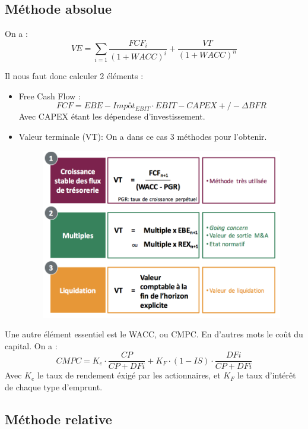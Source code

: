 \documentclass[12pt,oneside,a4paper]{article}
\begin{document}
\subsection{Méthode absolue} %
\label{sub:méthode_absolue}

On a :
\[
	VE= \sum_{i=1} \frac{FCF_i}{(1+WACC)^i} + \frac{VT}{(1+WACC)^n}
\]

Il nous faut donc calculer 2 éléments :

\begin{itemize}[label=]

	\item Free Cash Flow : 
	\[
		FCF=EBE-Impôt_{EBIT}\cdot EBIT - CAPEX +/- \Delta BFR
	\]
	Avec CAPEX étant les dépendese d'investissement.

	\item Valeur terminale (VT):
	On a dans ce cas 3 méthodes pour l'obtenir.

	\begin{figure}[H]
		\centering
		\includegraphics[scale=0.5]{img/im3}
	\end{figure}

\end{itemize}

Une autre élément essentiel est le WACC, ou CMPC. En d'autres mots le coût du capital. On a : 
\[
	CMPC=K_e\cdot \frac{CP}{CP+DFi} + K_F\cdot(1-IS) \cdot\frac{DFi}{CP+DFi}
\]
Avec $K_e$ le taux de rendement éxigé par les actionnaires, et $K_F$ le taux d'intérêt de chaque type d'emprunt.




\subsection{Méthode relative} %
\label{sub:méthode_relative}
\end{document}
